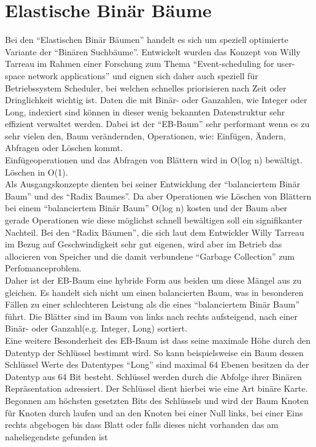 \documentclass[a4paper,11pt,oneside,%
headsepline,												%
footsepline,												%
bibtotocnumbered									%
]{scrreprt}
\begin{document}
\section{Elastische Binär Bäume}
\label{sec:ebTreeGrundlagen}
Bei den \enquote{Elastischen Binär Bäumen} handelt es sich um speziell optimierte Variante der \enquote{Binären Suchbäume}. Entwickelt wurden das Konzept von Willy Tarreau\autocite{Tarreau} im Rahmen einer Forschung zum Thema \enquote{Event-scheduling for user-space network applications} und eignen sich daher auch speziell für Betriebssystem Scheduler, bei welchen schnelles priorisieren nach Zeit oder Dringlichkeit wichtig ist. Daten die mit Binär- oder Ganzahlen, wie Integer oder Long, indexiert sind können in dieser wenig bekannten Datenstruktur sehr effizient verwaltet werden. Dabei ist der \enquote{\ac{EB-Baum}} sehr performant wenn es zu sehr vielen den, Baum verändernden, Operationen, wie: Einfügen, Ändern, Abfragen oder Löschen kommt.\\
Einfügeoperationen und das Abfragen von Blättern wird in O(log n) bewältigt. Löschen in O(1).\\
Als Ausgangskonzepte dienten bei seiner Entwicklung der \enquote{balanciertem Binär Baum} und des \enquote{Radix Baumes}. Da aber Operationen wie Löschen von Blättern bei einem \enquote{balanciertem Binär Baum} O(log n) kosten und der Baum aber gerade Operationen wie diese möglichst schnell bewältigen soll ein signifikanter Nachteil. Bei den \enquote{Radix Bäumen}, die sich laut dem Entwickler Willy Tarreau\autocite[Absatz Introduction]{Tarreau} im Bezug auf Geschwindigkeit sehr gut eigenen, wird aber im Betrieb das allocieren von Speicher und die damit verbundene \enquote{Garbage Collection} zum Perfomanceproblem.\\
Daher ist der \ac{EB-Baum} eine hybride Form aus beiden um diese Mängel aus zu gleichen. Es handelt sich nicht um einen balancierten Baum, was in besonderen Fällen zu einer schlechteren Leistung als die eines \enquote{balanciertem Binär Baum} führt. Die Blätter sind im Baum von links nach rechts aufsteigend, nach einer Binär- oder Ganzahl(e.g. Integer, Long) sortiert.\\
Eine weitere Besonderheit des \ac{EB-Baum} ist dass seine maximale Höhe durch den Datentyp der Schlüssel bestimmt wird.
So kann beispielsweise ein Baum dessen Schlüssel Werte des Datentypes \enquote{Long} sind maximal 64 Ebenen besitzen da der Datentyp aus 64 Bit besteht. Schlüssel werden durch die Abfolge ihrer Binären Repräsentation adressiert. Der Schlüssel dient hierbei wie eine Art binäre Karte. Begonnen am höchsten gesetzten Bits des Schlüssels und wird der Baum Knoten für Knoten durch laufen und an den Knoten bei einer Null links, bei einer Eins rechts abgebogen bis dass Blatt oder falls dieses nicht vorhanden das am naheliegendste gefunden ist
\end{document}
